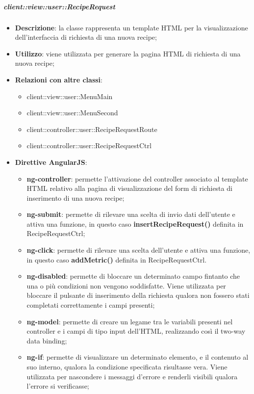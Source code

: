 
		\subparagraph{client::view::user::RecipeRequest} %
		\label{subp:bdsm_app_client_view_user_reciperequest}
			\begin{itemize}
				\item \textbf{Descrizione}: la classe rappresenta un template HTML per la visualizzazione dell'interfaccia di richiesta di una nuova recipe;
				\item \textbf{Utilizzo}: viene utilizzata per generare la pagina HTML di richiesta di una nuova recipe;
				\item \textbf{Relazioni con altre classi}:
					\begin{itemize}
						\item client::view::user::MenuMain
						\item client::view::user::MenuSecond
						\item client::controller::user::RecipeRequestRoute
						\item client::controller::user::RecipeRequestCtrl
					\end{itemize}
				\item \textbf{Direttive AngularJS}:
					\begin{itemize}
						\item \textbf{ng-controller}: permette l'attivazione del controller associato al template HTML relativo alla pagina di visualizzazione del form di richiesta di inserimento di una nuova recipe;
						\item \textbf{ng-submit}: permette di rilevare una scelta di invio dati dell'utente e attiva una funzione, in questo caso \textbf{insertRecipeRequest()} definita in RecipeRequestCtrl;
						\item \textbf{ng-click}: permette di rilevare una scelta dell'utente e attiva una funzione, in questo caso \textbf{addMetric()} definita in RecipeRequestCtrl.
						\item \textbf{ng-disabled}: permette di bloccare un determinato campo fintanto che una o più condizioni non vengono soddisfatte. Viene utilizzata per bloccare il pulsante di inserimento della richiesta qualora non fossero stati completati correttamente i campi presenti;
						\item \textbf{ng-model}: permette di creare un legame tra le variabili presenti nel controller e i campi di tipo input dell'HTML, realizzando così il two-way data binding;
						\item \textbf{ng-if}: permette di visualizzare un determinato elemento, e il contenuto al suo interno, qualora la condizione specificata risultasse vera. Viene utilizzata per nascondere i messaggi d'errore e renderli visibili qualora l'errore si verificasse;

\end{itemize}
\end{itemize}
